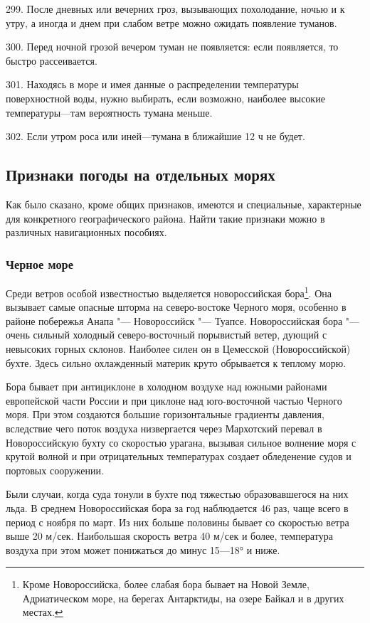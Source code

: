 299. После дневных или вечерних гроз, вызывающих похолодание, ночью и к утру, а иногда и днем при слабом ветре можно ожидать появление туманов.

300. Перед ночной грозой вечером туман не появляется: если появляется, то быстро рассеивается.

301. Находясь в море и имея данные о распределении температуры поверхностной воды, нужно выбирать, если возможно, наиболее высокие температуры—там вероятность тумана меньше.

302. Если утром роса или иней—тумана в ближайшие 12 ч не будет.

\subsection{Признаки погоды на отдельных морях}

Как было сказано, кроме общих признаков, имеются и специальные, характерные для конкретного географического района. Найти такие признаки можно в различных навигационных пособиях.

\subsubsection{Черное море}

Среди ветров особой известностью выделяется новороссийская
бора\footnote{Кроме Новороссийска, более слабая бора бывает на Новой
  Земле, Адриатическом море, на берегах Антарктиды, на озере Байкал и
  в других местах.}. Она вызывает самые опасные шторма на
северо-востоке Черного моря, особенно в районе побережья Анапа "---
Новороссийск "--- Туапсе. Новороссийская бора "--- очень сильный
холодный северо-восточный порывистый ветер, дующий с невысоких горных
склонов. Наиболее силен он в Цемесской (Новороссийской) бухте. Здесь
сильно охлажденный материк круто обрывается к теплому морю.

Бора бывает при антициклоне в холодном воздухе над южными районами европейской части России и при циклоне над юго-восточной частью Черного моря. При этом создаются большие горизонтальные градиенты давления, вследствие чего поток воздуха низвергается через Мархотский перевал в Новороссийскую бухту со скоростью урагана, вызывая сильное волнение моря с крутой волной и при отрицательных температурах создает обледенение судов и портовых сооружении.

Были случаи, когда суда тонули в бухте под тяжестью образовавшегося на них льда. В среднем Новороссийская бора за год наблюдается 46 раз, чаще всего в период с ноября по март. Из них больше половины бывает со скоростью ветра выше 20 м/сек. Наибольшая скорость ветра 40 м/сек и более, температура воздуха при этом может понижаться до минус 15—18° и ниже.

